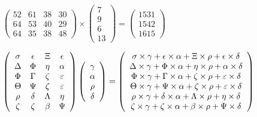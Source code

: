 \documentclass[12pt]{article}
\begin{document}
 
 
\noindent{}
 
 

 
$\left( \begin{array}{ccccccccccccccc}
          52  & 
          61  & 
          38  & 
          30  \\ 
          64  & 
          53  & 
          40  & 
          29  \\ 
          64  & 
          35  & 
          38  & 
          48
\end{array}\right) \times
\left( \begin{array}{c}
           7  \\ 
           9  \\ 
           6  \\ 
          13
\end{array}\right)  =
\left( \begin{array}{c}
        1531  \\ 
        1542  \\ 
        1615
\end{array}\right)  $
 
$  %
 \left( \begin{array}
 {
 c
 c
 c
 c
 }
 \sigma & 
 \epsilon & 
                    \Xi & 
 \epsilon \\ 
 \Delta & 
 \Phi & 
 \eta & 
 \alpha \\ 
 \Phi & 
 \Gamma & 
                    \zeta & 
 \varepsilon \\ 
 \Theta & 
 \Psi & 
                    \zeta & 
 \varepsilon \\ 
 \rho & 
 \delta & 
 \Lambda & 
 \eta \\ 
                    \zeta & 
                    \zeta & 
 \beta & 
 \Psi
 \end{array} \right)
 \left( \begin{array}
 {
 c
 }
 \gamma \\ 
 \alpha \\ 
 \rho \\ 
 \delta
 \end{array} \right)
=
 \left( \begin{array}
 {
 c
 }
  \sigma \times  \gamma +  \epsilon \times  \alpha +                     \Xi \times  \rho +  \epsilon \times  \delta \\ 
  \Delta \times  \gamma +  \Phi \times  \alpha +  \eta \times  \rho +  \alpha \times  \delta \\ 
  \Phi \times  \gamma +  \Gamma \times  \alpha +                     \zeta \times  \rho +  \varepsilon \times  \delta \\ 
  \Theta \times  \gamma +  \Psi \times  \alpha +                     \zeta \times  \rho +  \varepsilon \times  \delta \\ 
  \rho \times  \gamma +  \delta \times  \alpha +  \Lambda \times  \rho +  \eta \times  \delta \\ 
                     \zeta \times  \gamma +                     \zeta \times  \alpha +  \beta \times  \rho +  \Psi \times  \delta
 \end{array} \right)
$
 
\end{document}

